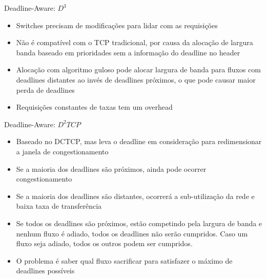 \documentclass[aspectratio=169]{beamer}
\begin{document}
	\begin{frame} {Deadline-Aware: $D^3$}
		\begin{itemize}
		 	\item
		 		Switches precisam de modificações para lidar com as requisições
		 	\item
				Não é compatível com o TCP tradicional, por causa da alocação de largura banda baseado em prioridades sem a informação do deadline no header
		 	\item
				Alocação com algoritmo guloso pode alocar largura de banda para fluxos com deadlines distantes ao invés de deadlines próximos, o que pode causar maior perda de deadlines
		 	\item
				Requisições constantes de taxas tem um overhead
		 \end{itemize}
	\end{frame}

	\begin{frame} {Deadline-Aware: $D^2TCP$}
		\begin{itemize}
		 	\item
		 		Baseado no DCTCP, mas leva o deadline em consideração para redimensionar a janela de congestionamento
		 	\item
				Se a maioria dos deadlines são próximos, ainda pode ocorrer congestionamento
		 	\item
				Se a maioria dos deadlines são distantes, ocorrerá a sub-utilização da rede e baixa taxa de transferência
		 	\item
				Se todos os deadlines são próximos, estão competindo pela largura de banda e nenhum fluxo é adiado, todos os deadlines não serão cumpridos. Caso um fluxo seja adiado, todos os outros podem ser cumpridos.
		 	\item
				O problema é saber qual fluxo sacrificar para satisfazer o máximo de deadlines possíveis
		 \end{itemize}
	\end{frame}
\end{document}

